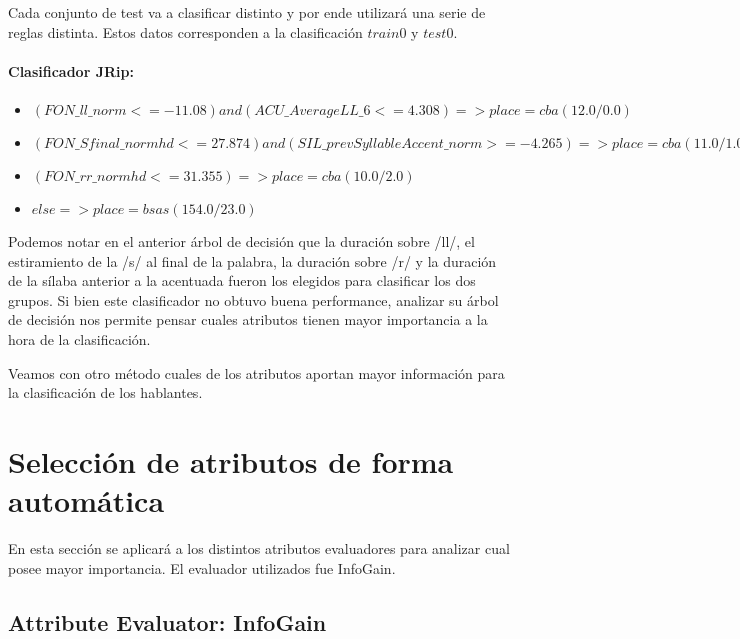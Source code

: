 Cada conjunto de test va a clasificar distinto y por ende utilizará una serie de reglas distinta. Estos datos corresponden a la clasificación $train 0$ y $test 0$.

\paragraph*{Clasificador JRip:}

\begin{flushleft}
\begin{itemize}

\item $(FON\_ll\_norm <= -11.08) and (ACU\_AverageLL\_6 <= 4.308) => place=cba (12.0/0.0)$ \\
\item $(FON\_Sfinal\_normhd <= 27.874) and (SIL\_prevSyllableAccent\_norm >= -4.265) => place=cba (11.0/1.0)$ \\
\item $(FON\_rr\_normhd <= 31.355) => place=cba (10.0/2.0)$ \\
\item $ else  => place=bsas (154.0/23.0)$
\end{itemize}
\end{flushleft}

Podemos notar en el anterior árbol de decisión que la duración sobre /ll/, el estiramiento de la /s/ al final de la palabra, la duración sobre /r/ y la duración de la sílaba anterior a la acentuada fueron los elegidos para clasificar los dos grupos. Si bien este clasificador no obtuvo buena performance, analizar su árbol de decisión nos permite pensar cuales atributos tienen mayor importancia a la hora de la clasificación.

Veamos con otro método cuales de los atributos aportan mayor información para la clasificación de los hablantes.   

\section{Selección de atributos de forma automática}

En esta sección se aplicará a los distintos atributos evaluadores para analizar cual posee mayor importancia. El evaluador utilizados fue InfoGain. 

\subsection*{Attribute Evaluator: InfoGain}

